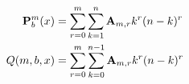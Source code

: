 \begin{align*}
    {\mathbf{P}}\sp{m} \sb{b}(x) &= \sum_{r=0}^{m} \sum_{k=1}^{n} {\mathbf{A}} \sb{m,r} k^r (n-k)^r \\
    {Q}(m,b,x) &= \sum_{r=0}^{m} \sum_{k=0}^{n-1} {\mathbf{A}} \sb{m,r} k^r (n-k)^r
\end{align*}
